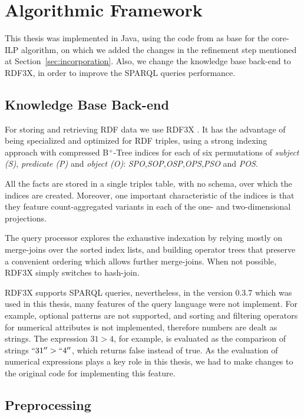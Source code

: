 \chapter{Algorithmic Framework}
\label{af:intro}

This thesis was implemented in Java, using the code from \citet{Teflioudi2011} as base for the core-ILP
algorithm, on which we added the changes in the refinement step mentioned at Section~\ref{sec:incorporation}. Also, we
change the knowledge base back-end to RDF3X, in order to improve the SPARQL queries performance.

\section{Knowledge Base Back-end}

For storing and retrieving RDF data we use RDF3X \citep{Neumann:2010:RES:1731351.1731354}. It has the advantage of being
specialized and optimized for RDF triples, using a strong indexing approach with compressed B$^+$-Tree indices for each
of six permutations of \emph{subject (S)}, \emph{predicate (P)} and \emph{object (O)}:
\emph{SPO},\emph{SOP},\emph{OSP},\emph{OPS},\emph{PSO} and \emph{POS}.

All the facts are stored in a single triples table, with no schema, over which the indices are created. Moreover, one
important characteristic of the indices is that they feature count-aggregated variants in each of the one- and
two-dimensional projections.

The query processor explores the exhaustive indexation by relying mostly on merge-joins over the sorted index lists, and
building operator trees that preserve a convenient ordering which allows further merge-joins. When not possible,
RDF3X simply switches to hash-join.

RDF3X supports SPARQL queries, nevertheless, in the version 0.3.7 which was used in this thesis, many features of the
query language were not implement. For example, optional patterns are not supported, and sorting and filtering
operators for numerical attributes is not implemented, therefore numbers are dealt as strings. The expression $31>4$,
for example, is evaluated as the comparison of strings $``31''>``4''$, which returns false instead of true. As the
evaluation of numerical expressions plays a key role in this thesis, we had to make changes to the original code
for implementing this feature.


\section{Preprocessing}

